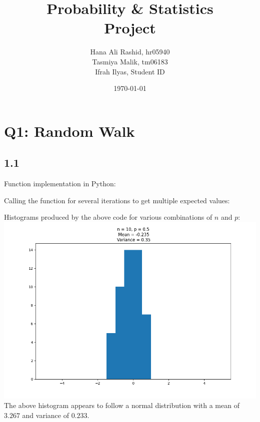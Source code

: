 \documentclass[answers]{exam}
\title{Probability \& Statistics\\ Project}
\author{Hana Ali Rashid, hr05940\\ Tasmiya Malik, tm06183\\ Ifrah Ilyas, Student ID}
\date{\today{}}
\begin{document}
\maketitle



\section*{Q1: Random Walk}
\subsection*{1.1}
Function implementation in Python:

Calling the function for several iterations to get multiple expected values:

\pagebreak
Histograms produced by the above code for various combinations of $n$ and $p$:\\
\includegraphics[scale = 0.5]{Q1_histograms/1.1/q1_n = 10_ p = 0.5.png}\\
The above histogram appears to follow a normal distribution with a mean of $3.267$ and variance of $0.233$.\\
\end{document}
